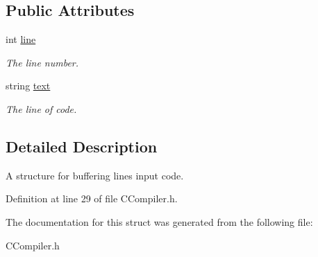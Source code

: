 \subsection*{Public Attributes}
\begin{DoxyCompactItemize}
\item 
\hypertarget{structInputLine_aef26343331dc90be48f6fdbf4ab85276}{int \hyperlink{structInputLine_aef26343331dc90be48f6fdbf4ab85276}{line}}\label{structInputLine_aef26343331dc90be48f6fdbf4ab85276}

\begin{DoxyCompactList}\small\item\em The line number. \end{DoxyCompactList}\item 
\hypertarget{structInputLine_aa448799cf6fd6735d55c2cadb394e16f}{string \hyperlink{structInputLine_aa448799cf6fd6735d55c2cadb394e16f}{text}}\label{structInputLine_aa448799cf6fd6735d55c2cadb394e16f}

\begin{DoxyCompactList}\small\item\em The line of code. \end{DoxyCompactList}\end{DoxyCompactItemize}


\subsection{Detailed Description}
A structure for buffering lines input code. 

Definition at line 29 of file C\-Compiler.\-h.



The documentation for this struct was generated from the following file\-:\begin{DoxyCompactItemize}
\item 
C\-Compiler.\-h\end{DoxyCompactItemize}
